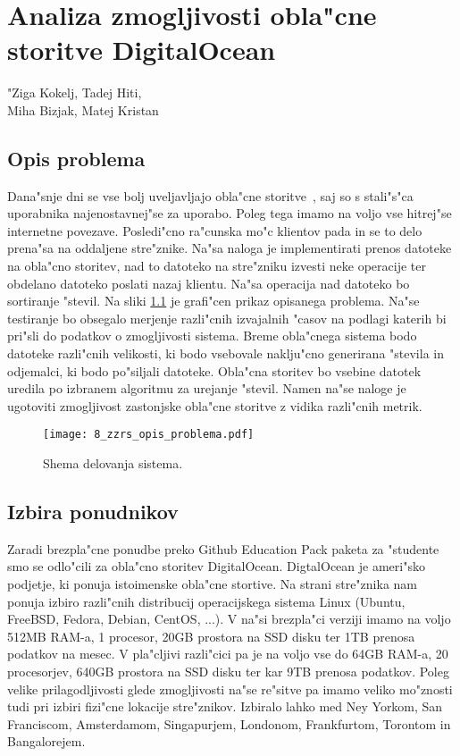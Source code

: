 \chapter[Analiza zmogljivosti obla"cne storitve DigitalOcean]{Analiza zmogljivosti obla"cne storitve DigitalOcean}

\pagestyle{fancy}
\fancyhf{}
\fancyhead[LE,RO]{\thepage}
\fancyhead[RE,LO]{\leftmark}

\huge "Ziga Kokelj, Tadej Hiti,\\Miha Bizjak, Matej Kristan
\normalsize
\bigskip

\section{Opis problema} \label{8_opis_problema}
\noindent Dana"snje dni se vse bolj uveljavljajo obla"cne storitve~\cite{8_servers}, saj so s stali"s"ca uporabnika najenostavnej"se za uporabo. Poleg tega imamo na voljo vse hitrej"se internetne povezave. Posledi"cno ra"cunska mo"c klientov pada in se to delo prena"sa na oddaljene stre"znike.  Na"sa naloga je implementirati prenos datoteke na obla"cno storitev, nad to datoteko na stre"zniku izvesti neke operacije ter obdelano datoteko poslati nazaj klientu. Na"sa operacija nad datoteko bo sortiranje "stevil. Na sliki \ref{8_opis_problema} je grafi"cen prikaz opisanega problema. Na"se testiranje bo obsegalo merjenje razli"cnih izvajalnih "casov na podlagi katerih bi pri"sli do podatkov o zmogljivosti sistema. Breme obla"cnega sistema bodo datoteke razli"cnih velikosti, ki bodo vsebovale naklju"cno generirana "stevila in odjemalci, ki bodo po"siljali datoteke. Obla"cna storitev bo vsebine datotek uredila po izbranem algoritmu za urejanje "stevil. Namen na"se naloge je ugotoviti zmogljivost zastonjske obla"cne storitve z vidika razli"cnih metrik.

\begin{figure}
  \centering
    \texttt{[image: 8\_zzrs\_opis\_problema.pdf]}
  \caption{Shema delovanja sistema.}
  \label{8_opis_problema}
\end{figure}


\section{Izbira ponudnikov}
Zaradi brezpla"cne ponudbe preko Github Education Pack paketa za "studente smo se odlo"cili za obla"cno storitev DigitalOcean. DigtalOcean je ameri"sko podjetje, ki ponuja istoimenske obla"cne stortive. Na strani stre"znika nam ponuja izbiro razli"cnih distribucij operacijskega sistema Linux (Ubuntu, FreeBSD, Fedora, Debian, CentOS, ...).
V na"si brezpla"ci verziji imamo na voljo 512MB RAM-a, 1 procesor, 20GB prostora na SSD disku ter 1TB prenosa podatkov na mesec. V pla"cljivi razli"cici pa je na voljo vse do 64GB RAM-a, 20 procesorjev, 640GB prostora na SSD disku ter kar 9TB prenosa podatkov. Poleg velike prilagodljivosti glede zmogljivosti na"se re"sitve pa imamo veliko mo"znosti tudi pri izbiri fizi"cne lokacije stre"znikov. 
Izbiralo lahko med Ney Yorkom, San Franciscom, Amsterdamom, Singapurjem, Londonom, Frankfurtom, Torontom in Bangalorejem. 

